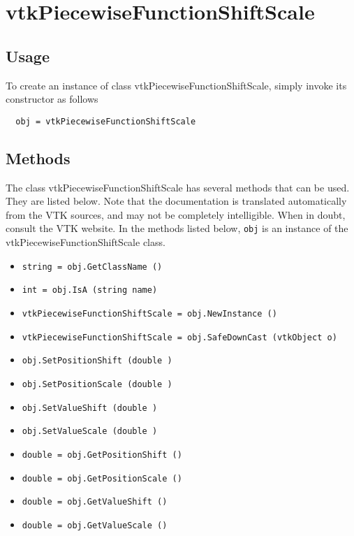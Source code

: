 \section{vtkPiecewiseFunctionShiftScale}

\subsection{Usage}


To create an instance of class vtkPiecewiseFunctionShiftScale, simply
invoke its constructor as follows
\begin{verbatim}
  obj = vtkPiecewiseFunctionShiftScale
\end{verbatim}
\subsection{Methods}

The class vtkPiecewiseFunctionShiftScale has several methods that can be used.
  They are listed below.
Note that the documentation is translated automatically from the VTK sources,
and may not be completely intelligible.  When in doubt, consult the VTK website.
In the methods listed below, \verb|obj| is an instance of the vtkPiecewiseFunctionShiftScale class.
\begin{itemize}
\item  \verb|string = obj.GetClassName ()|

\item  \verb|int = obj.IsA (string name)|

\item  \verb|vtkPiecewiseFunctionShiftScale = obj.NewInstance ()|

\item  \verb|vtkPiecewiseFunctionShiftScale = obj.SafeDownCast (vtkObject o)|

\item  \verb|obj.SetPositionShift (double )|

\item  \verb|obj.SetPositionScale (double )|

\item  \verb|obj.SetValueShift (double )|

\item  \verb|obj.SetValueScale (double )|

\item  \verb|double = obj.GetPositionShift ()|

\item  \verb|double = obj.GetPositionScale ()|

\item  \verb|double = obj.GetValueShift ()|

\item  \verb|double = obj.GetValueScale ()|

\end{itemize}
